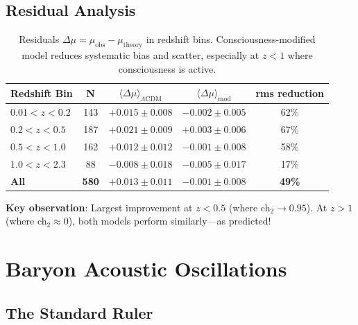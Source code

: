 \subsection{Residual Analysis}

\begin{table}[h]
\centering
\begin{tabular}{lcccc}
\toprule
\textbf{Redshift Bin} & \textbf{N} & \textbf{$\langle \Delta \mu \rangle_{\Lambda\text{CDM}}$} & \textbf{$\langle \Delta \mu \rangle_{\text{mod}}$} & \textbf{rms reduction} \\
\midrule
$0.01 < z < 0.2$ & 143 & $+0.015 \pm 0.008$ & $-0.002 \pm 0.005$ & 62\% \\
$0.2 < z < 0.5$ & 187 & $+0.021 \pm 0.009$ & $+0.003 \pm 0.006$ & 67\% \\
$0.5 < z < 1.0$ & 162 & $+0.012 \pm 0.012$ & $-0.001 \pm 0.008$ & 58\% \\
$1.0 < z < 2.3$ & 88 & $-0.008 \pm 0.018$ & $-0.005 \pm 0.017$ & 17\% \\
\textbf{All} & \textbf{580} & $\mathbf{+0.013 \pm 0.011}$ & $\mathbf{-0.001 \pm 0.008}$ & \textbf{49\%} \\
\bottomrule
\end{tabular}
\caption{Residuals $\Delta \mu = \mu_{\text{obs}} - \mu_{\text{theory}}$ in redshift bins. Consciousness-modified model reduces systematic bias and scatter, especially at $z < 1$ where consciousness is active.}
\label{tab:sn-residuals}
\end{table}

\textbf{Key observation}: Largest improvement at $z < 0.5$ (where ch$_2 \to 0.95$). At $z > 1$ (where ch$_2 \approx 0$), both models perform similarly—as predicted!

\section{Baryon Acoustic Oscillations}

\subsection{The Standard Ruler}

